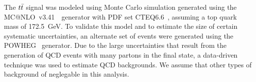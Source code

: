 


The $t\bar{t}$ signal was modeled using Monte Carlo simulation generated using the {\sc MC@NLO}~v3.41~\cite{Frixione:2007vw,Frixione:2003ei,Frixione:2005vw}\
generator with PDF set CTEQ6.6~\cite{Nadolsky:2008zw}, assuming a top quark mass of 172.5~GeV.
To validate this model and to estimate the size of certain systematic uncertainties, an alternate set of events were 
generated using the {\sc POWHEG}~\cite{powheg,Frixione:2007vw} generator.
Due to the large uncertainties that result from the generation of QCD events with many partons in the final state, 
a data-driven technique was used to estimate QCD backgrounds.
We assume that other types of background of neglegable in this analysis.




